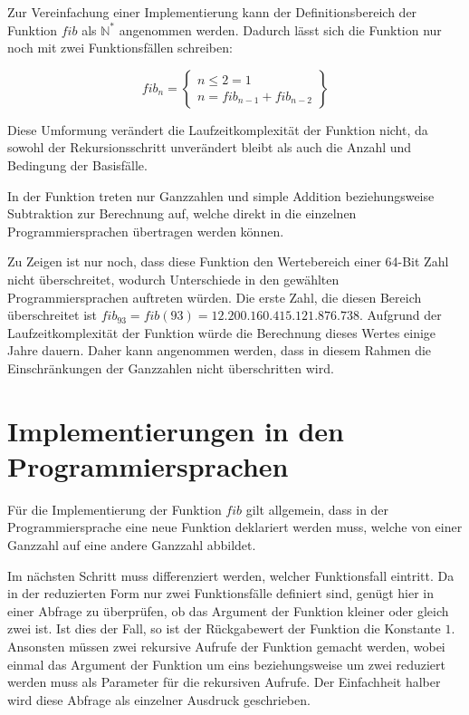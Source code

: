 \documentclass[11pt, parskip=half]{scrartcl}       %
\newcommand*{\N}{\mathbb{N}}
\begin{document}
Zur Vereinfachung einer Implementierung kann der Definitionsbereich der Funktion $fib$ als $\N^*$ angenommen werden. Dadurch lässt sich die Funktion nur noch mit zwei Funktionsfällen schreiben:

$$
fib _{n} = \left.
  \begin{cases}
    n \leq 2 = 1 \\
    n = fib_{n-1} + fib_{n-2}
  \end{cases}
\right\}
$$

Diese Umformung verändert die Laufzeitkomplexität der Funktion nicht, da sowohl der Rekursionsschritt unverändert bleibt als auch die Anzahl und Bedingung der Basisfälle.

In der Funktion treten nur Ganzzahlen und simple Addition beziehungsweise Subtraktion zur Berechnung auf, welche direkt in die einzelnen Programmiersprachen übertragen werden können.

Zu Zeigen ist nur noch, dass diese Funktion den Wertebereich einer 64-Bit Zahl nicht überschreitet, wodurch Unterschiede in den gewählten Programmiersprachen auftreten würden. Die erste Zahl, die diesen Bereich überschreitet ist $fib_{93} = fib(93) = 12.200.160.415.121.876.738$. Aufgrund der Laufzeitkomplexität der Funktion würde die Berechnung dieses Wertes einige Jahre dauern. Daher kann angenommen werden, dass in diesem Rahmen die Einschränkungen der Ganzzahlen nicht überschritten wird. 

\section{Implementierungen in den Programmiersprachen}

Für die Implementierung der Funktion $fib$ gilt allgemein, dass in der Programmiersprache eine neue Funktion deklariert werden muss, welche von einer Ganzzahl auf eine andere Ganzzahl abbildet.

Im nächsten Schritt muss differenziert werden, welcher Funktionsfall eintritt.
Da in der reduzierten Form nur zwei Funktionsfälle definiert sind, genügt hier in einer Abfrage zu überprüfen, ob  das Argument der Funktion kleiner oder gleich zwei ist.
Ist dies der Fall, so ist der Rückgabewert der Funktion die Konstante $1$.
Ansonsten müssen zwei rekursive Aufrufe der Funktion gemacht werden, wobei einmal das Argument der Funktion um eins beziehungsweise um zwei reduziert werden muss als Parameter für die rekursiven Aufrufe.
Der Einfachheit halber wird diese Abfrage als einzelner Ausdruck geschrieben.
\end{document}
